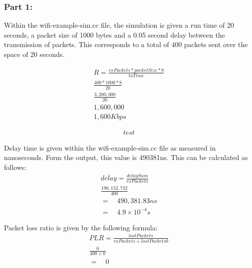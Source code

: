 \subsubsection{Part 1:}

Within the wifi-example-sim.cc file, the simulation is given a run time of 20
seconds, a packet size of 1000 bytes and a 0.05 second delay between the
transmission of packets. This corresponds to a total of 400 packets sent over
the space of 20 seconds.

\begin{gather*}
	R=\frac{rxPackets*packetSize*8}{txTime} \\
	\frac{400*1000*8}{20} \\
	\frac{3,200,000}{20} \\
	1,600,000 \\
	1,600Kbps
\end{gather*}

\begin{gather*}
	test
\end{gather*}

\par Delay time is given within the wifi-example-sim.cc file as measured in
nanoseconds. Form the output, this value is 490381ns. This can be calculated as
follows:
\begin{gather*}
	\overline{delay}=\frac{delaySum}{rxPackets} \\
	\frac{196,152,732}{400} \\
	= \quad 490,381.83ns \\
	= \quad 4.9\times10^{-4}s
\end{gather*}

Packet loss ratio is given by the following formula:
\begin{gather*}
	PLR = \frac{lostPackets}{rxPackets+lostPackets0} \\
	\frac{0}{400+0} \\
	= \quad 0
\end{gather*}
